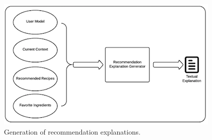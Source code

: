   \begin{figure}[h]
  	\centering
  	\includegraphics[width=.8\linewidth]{figures/ch3_explanation_generator.png}
  	\caption{Generation of recommendation explanations.}
  	\label{fig:ch3_explanation_generator}
  \end{figure}